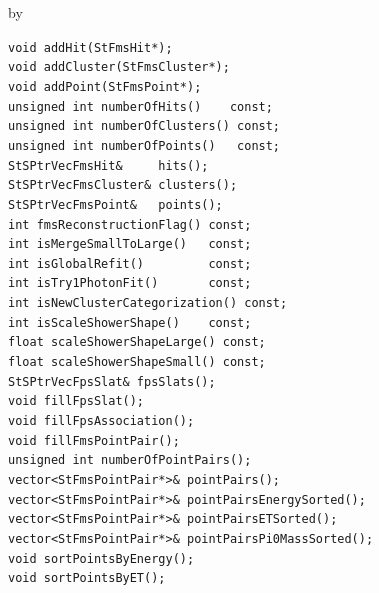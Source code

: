 \documentclass[twoside]{article}
\newcommand{\entrylabel}[1]{\mbox{\textbf{{#1}}}\hfil}%
\newenvironment{entry}
{\begin{list}{}%
    {\renewcommand{\makelabel}{\entrylabel}%
     \setlength{\labelwidth}{90pt}%
     \setlength{\leftmargin}{\labelwidth}
     \advance\leftmargin by \labelsep%
      }%
    }%
  {\end{list}}
\newcommand{\Entrylabel}[1]%
{\raisebox{0pt}[1ex][0pt]{\makebox[\labelwidth][l]%
    {\parbox[t]{\labelwidth}{\hspace{0pt}\textbf{{#1}}}}}}
\newenvironment{Entry}%
{\renewcommand{\entrylabel}{\Entrylabel}\begin{entry}}%
  {\end{entry}}
\begin{document}
\begin{Entry}
\item[Public Member\\ Functions]
    \verb+void addHit(StFmsHit*);+\\
    \verb+void addCluster(StFmsCluster*);+\\
    \verb+void addPoint(StFmsPoint*);+\\
    \verb+unsigned int numberOfHits()    const;+\\
    \verb+unsigned int numberOfClusters() const;+\\
    \verb+unsigned int numberOfPoints()   const;+\\
    \verb+StSPtrVecFmsHit&     hits();+\\
    \verb+StSPtrVecFmsCluster& clusters();+\\
    \verb+StSPtrVecFmsPoint&   points();+\\
    \verb+int fmsReconstructionFlag() const;+\\
    \verb+int isMergeSmallToLarge()   const;+\\
    \verb+int isGlobalRefit()         const;+\\
    \verb+int isTry1PhotonFit()       const;+\\
    \verb+int isNewClusterCategorization() const;+\\
    \verb+int isScaleShowerShape()    const;+\\
    \verb+float scaleShowerShapeLarge() const;+\\
    \verb+float scaleShowerShapeSmall() const;+\\
    \verb+StSPtrVecFpsSlat& fpsSlats();+\\
    \verb+void fillFpsSlat();+\\
    \verb+void fillFpsAssociation();+\\
    \verb+void fillFmsPointPair();+\\
    \verb+unsigned int numberOfPointPairs();+\\
    \verb+vector<StFmsPointPair*>& pointPairs();+\\
    \verb+vector<StFmsPointPair*>& pointPairsEnergySorted();+\\
    \verb+vector<StFmsPointPair*>& pointPairsETSorted();+\\
    \verb+vector<StFmsPointPair*>& pointPairsPi0MassSorted();+\\
    \verb+void sortPointsByEnergy();+\\
    \verb+void sortPointsByET();+\\
\end{Entry}
\clearpage
\end{document}
